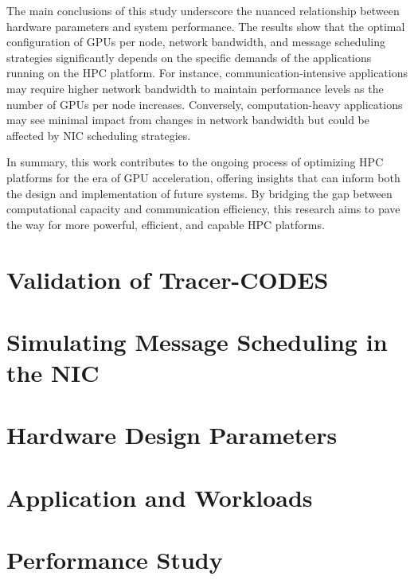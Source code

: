 The main conclusions of this study underscore the nuanced relationship between hardware parameters and system performance. The results show that the optimal configuration of GPUs per node, network bandwidth, and message scheduling strategies significantly depends on the specific demands of the applications running on the HPC platform. For instance, communication-intensive applications may require higher network bandwidth to maintain performance levels as the number of GPUs per node increases. Conversely, computation-heavy applications may see minimal impact from changes in network bandwidth but could be affected by NIC scheduling strategies. 


In summary, this work contributes to the ongoing process of optimizing HPC platforms for the era of GPU acceleration, offering insights that can inform both the design and implementation of future systems. By bridging the gap between computational capacity and communication efficiency, this research aims to pave the way for more powerful, efficient, and capable HPC platforms.

\section{Validation of Tracer-CODES}


\section{Simulating Message Scheduling in the NIC}


\section{Hardware Design Parameters}



\section{Application and Workloads}


\section{Performance Study}


